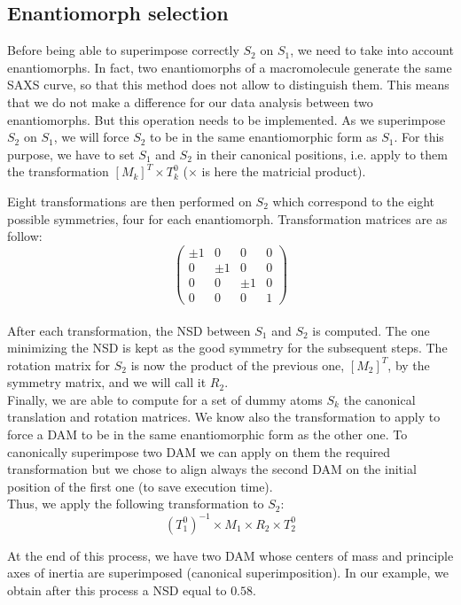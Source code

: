\documentclass[a4paper, 11pt]{report}
\begin{document}
\subsection{Enantiomorph selection}

Before being able to superimpose correctly $S_{2}$ on $S_{1}$, we need 
to take into account enantiomorphs. 
In fact, two enantiomorphs of a macromolecule generate the same SAXS 
curve, so that this method does not allow to distinguish them. 
This means that we do not make a difference for our data analysis 
between two enantiomorphs.
But this operation needs to be implemented. 
As we superimpose $S_{2}$ on $S_{1}$, we will force $S_{2}$ to be in 
the same enantiomorphic form as $S_{1}$. 
For this purpose, we have to set $S_{1}$ and $S_{2}$ in their canonical 
positions, i.e. apply to them the transformation 
$[M_{k}]^T \times T_{k}^0$ ($\times$ is here the matricial product).

Eight transformations are then performed on $S_{2}$ which correspond 
to the eight possible symmetries, four for each enantiomorph. 
Transformation matrices are as follow:
\[
\begin{pmatrix}
 \pm 1 & 0 & 0 & 0 \\
 0 & \pm 1 & 0 & 0 \\
 0 & 0 & \pm 1 & 0 \\
 0 & 0 & 0 & 1
\end{pmatrix}
\]\\
After each transformation, the NSD between $S_{1}$ and $S_{2}$ is 
computed. 
The one minimizing the NSD is kept as the good symmetry for the 
subsequent steps. 
The rotation matrix for $S_{2}$ is now the product of the previous 
one, $[M_{2}]^T$, by the symmetry matrix, and we will call it 
$R_{2}$.\\

Finally, we are able to compute for a set of dummy atoms $S_{k}$ the 
canonical translation and rotation matrices. 
We know also the transformation to apply to force a DAM to be in the 
same enantiomorphic form as the other one. 
To canonically superimpose two DAM we can apply on them the required 
transformation but we chose to align always the second DAM on the 
initial position of the first one (to save execution time).\\
Thus, we apply the following transformation to $S_{2}$:
\[(T_{1}^0)^{-1} \times M_{1} \times R_{2} \times T_{2}^0\]

At the end of this process, we have two DAM whose centers of mass and 
principle axes of inertia are superimposed (canonical superimposition). 
In our example, we obtain after this process a NSD equal to $0.58$.
\end{document}
